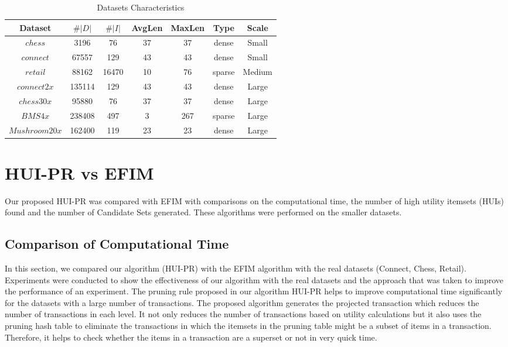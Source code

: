 \documentclass[11pt,openright]{report}
\begin{document}
\begin{table}[!htbp]
	\renewcommand{\arraystretch}{1.3}
	\caption{Datasets Characteristics}
	\label{dataset_table}
	\centering
	\begin{tabular}{|c||c|c|c|c|c|c|}
		\hline
		\bfseries Dataset & \bfseries $\#|D|$ & \bfseries $\#|I|$ & \bfseries AvgLen & \bfseries MaxLen & \bfseries Type & \bfseries Scale\\
		\hline\hline
		$chess$ & 3196 & 76 & 37 & 37 & dense & Small\\ \hline
		$connect$ & 67557 & 129 & 43 & 43 & dense & Small\\ \hline
		$retail$ & 88162 & 16470 & 10 & 76 & sparse & Medium \\ \hline
		$connect2x$ & 135114 & 129 & 43 & 43 & dense & Large\\ \hline
		$chess30x$ & 95880 & 76 & 37 & 37 & dense & Large\\ \hline
		$BMS4x$ & 238408 & 497 & 3 & 267 & sparse & Large \\ \hline
		$Mushroom20x$ & 162400 & 119 & 23 & 23 & dense & Large\\ \hline
	\end{tabular}
\end{table}

\section{HUI-PR vs EFIM}
Our proposed HUI-PR was compared with EFIM \cite{Zida2015} with comparisons on the computational time, the number of high utility itemsets (HUIs) found and the number of Candidate Sets generated. These algorithms were performed on the smaller datasets.

\subsection{Comparison of Computational Time}
In this section, we compared our algorithm (HUI-PR) with the EFIM algorithm \cite{Zida2015} with the real datasets (Connect, Chess, Retail). Experiments were conducted to show the effectiveness of our algorithm with the real datasets and the approach that was taken to improve the performance of an experiment. The pruning rule proposed in our algorithm HUI-PR helps to improve computational time significantly for the datasets with a large number of transactions. The proposed algorithm generates the projected transaction which reduces the number of transactions in each level. It not only reduces the number of transactions based on utility calculations but it also uses the pruning hash table to eliminate the transactions in which the itemsets in the pruning table might be a subset of items in a transaction. Therefore, it helps to check whether the items in a transaction are a superset or not in very quick time.
\end{document}
